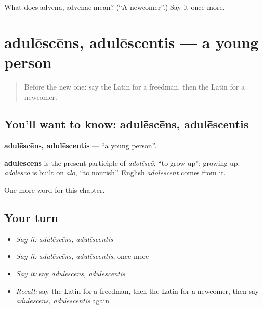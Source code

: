 \begin{tcolorbox}[breakable,colback=teal!4,colframe=teal!35!black,title={Before you move on}]
What does advena, advenae mean? (\textquotedblleft{}A newcomer\textquotedblright{}.) Say it once more.
\end{tcolorbox}
\section[adulēscēns, adulēscentis]{adulēscēns, adulēscentis — a young person}

\label{lesson:LA-C220-adulescens}



\begin{quote}
Before the new one: say the Latin for a freedman, then the Latin for a newcomer.
\end{quote}

\subsection*{You'll want to know: adulēscēns, adulēscentis}
\textbf{adulēscēns, adulēscentis} — \textquotedblleft{}a young person\textquotedblright{}.

\begin{cousinweb}
\textbf{adulēscēns} is the present participle of \emph{adolēscō}, \textquotedblleft{}to grow up\textquotedblright{}: growing up. \emph{adolēscō} is built on \emph{alō}, \textquotedblleft{}to nourish\textquotedblright{}. English \emph{adolescent} comes from it.
\end{cousinweb}

\begin{grammarlens}[title={What you've built}]
One more word for this chapter.
\end{grammarlens}

\subsection*{Your turn}
\begin{itemize}
\raggedright
  \item \emph{Say it:} \emph{adulēscēns, adulēscentis}
  \item \emph{Say it:} \emph{adulēscēns, adulēscentis}, once more
  \item \emph{Say it:} say \emph{adulēscēns, adulēscentis}
  \item \emph{Recall:} say the Latin for a freedman, then the Latin for a newcomer, then say \emph{adulēscēns, adulēscentis} again
\end{itemize}

